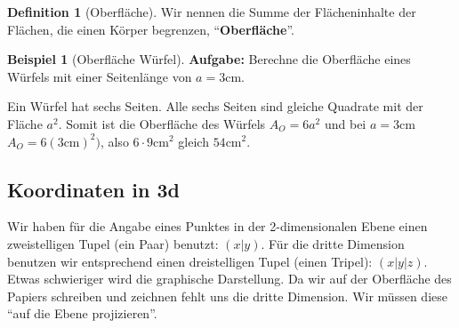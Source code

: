 \documentclass[a4paper]{book}%
\theoremstyle{definition}
\newtheorem{definition}{Definition}
\newtheorem{beispiel}{Beispiel}
\begin{document}
\begin{definition}[Oberfläche]
    Wir nennen die Summe der Flächeninhalte der Flächen, die einen Körper begrenzen, \enquote{\textbf{Oberfläche}}.
\end{definition}

\begin{beispiel}[Oberfläche Würfel]
    \textbf{Aufgabe:} Berechne die Oberfläche eines Würfels mit einer Seitenlänge von $a=3\text{cm}$.

    Ein Würfel hat sechs Seiten. Alle sechs Seiten sind gleiche Quadrate mit der Fläche $a^2$. Somit ist die Oberfläche des Würfels $A_O = 6a^2$ und bei $a=3\text{cm}$ $A_O=6 (3\text{cm})^2)$, also $6 \cdot 9\text{cm}^2$ gleich $54\text{cm}^2$.
\end{beispiel}


\subsection{Koordinaten in 3d}

Wir haben für die Angabe eines Punktes in der 2-dimensionalen Ebene einen zweistelligen Tupel (ein Paar) benutzt: $(x|y)$. Für die dritte Dimension benutzen wir entsprechend einen dreistelligen Tupel (einen Tripel): $(x|y|z)$. Etwas schwieriger wird die graphische Darstellung. Da wir auf der Oberfläche des Papiers schreiben und zeichnen fehlt uns die dritte Dimension. Wir müssen diese \enquote{auf die Ebene projizieren}.
\end{document}
